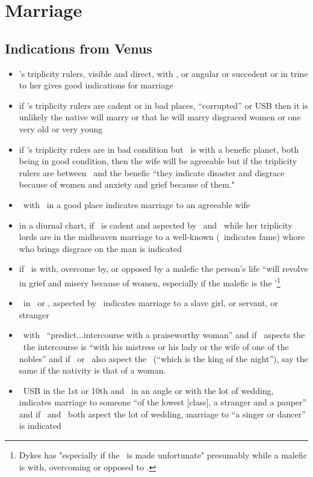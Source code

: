 \section{Marriage}
\subsection{Indications from Venus}
\begin{itemize}[topsep=0em,itemsep=0em]
\item \Venus's triplicity rulers, visible and direct, with \Venus, or angular or succedent or in trine to her gives good indications for marriage

\item if \Venus's triplicity rulers are cadent or in bad places, ``corrupted'' or USB then it is unlikely the native will marry or that he will marry disgraced women or one very old or very young

\item if \Venus's triplicity rulers are in bad condition but \Venus\, is with a benefic planet, both being in good condition, then the wife will be agreeable but if the triplicity rulers are between \Venus\, and the benefic ``they indicate disaster and disgrace because of women and anxiety and grief because of them."

\item \Venus\, with \Jupiter\, in a good place indicates marriage to an agreeable wife

\item  in a diurnal chart, if \Venus\, is cadent and aspected by \Jupiter\, and \Mars\, while her triplicity lords are in the midheaven marriage to a well-known (\Jupiter\, indicates fame) whore who brings disgrace on the man is indicated

\item if \Venus\, is with, overcome by, or opposed by a malefic the person's life ``will revolve in grief and misery because of women, especially if the malefic is the \Moon'\footnote{Dykes has "especially if the \Moon\ is made unfortunate" presumably while a malefic is with, overcoming or opposed to \Venus. }

\item \Mercury\, in \Taurus\, or \Libra, aspected by \Saturn\, indicates marriage to a slave girl, or servant, or stranger

\item \Jupiter\, with \Venus\, ``predict...intercourse with a praiseworthy woman'' and if \Jupiter\, aspects the \Moon\,  the intercourse is ``with his mistress or his lady or the wife of one of the nobles'' and if \Saturn\, or \Mars\, also aspect the \Moon\, (``which is the king of the night''), say the same if the nativity is that of a woman.
\item \Venus\, USB in the 1st or 10th and \Mars\, in an angle or with the lot of wedding, indicates marriage to someone ``of the lowest [class], a stranger and a pauper'' and if \Mercury\, and \Venus\, both aspect the lot of wedding, marriage to ``a singer or dancer'' is indicated
\end{itemize}

